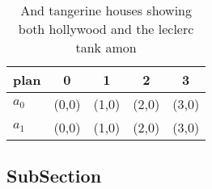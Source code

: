 \documentclass[a4paper]{article}
\begin{document}
\begin{table}
\begin{adjustbox}{width=0.5\columnwidth}
\begin{tabular}{|l|l|l|l|l|}
\hline
\textbf{plan} & \multicolumn{1}{c|}{\textbf{0}} & \multicolumn{1}{c|}{\textbf{1}} & \multicolumn{1}{c|}{\textbf{2}} & \multicolumn{1}{c|}{\textbf{3}} \\ \hline
\textbf{$a_0$}  & (0,0) & (1,0) & (2,0) & (3,0) \\ \hline
\textbf{$a_1$}  & (0,0) & (1,0) & (2,0) & (3,0) \\ \hline
\end{tabular}
\end{adjustbox}
\caption{And tangerine houses showing both hollywood and the leclerc tank amon
}
\end{table}

\subsection{SubSection}
\end{document}
